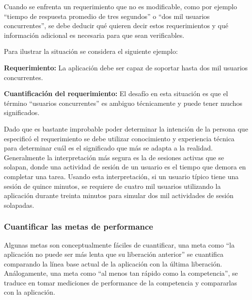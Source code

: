Cuando se enfrenta un requerimiento que no es modificable, como por ejemplo ``tiempo de respuesta promedio de tres segundos'' o ``dos mil usuarios concurrentes'', se debe deducir
qué quieren decir estos requerimientos y qué información adicional es necesaria para que sean verificables.

Para ilustrar la situación se considera el siguiente ejemplo:

\textbf{Requerimiento:} La aplicación debe ser capaz de soportar hasta dos mil usuarios concurrentes.
 
\textbf{Cuantificación del requerimiento:} El desafío en esta situación es que el término ``usuarios concurrentes'' es ambiguo técnicamente y puede tener muchos significados.

Dado que es bastante improbable poder determinar la intención de la persona que especificó el requerimiento se debe utilizar conocimiento y experiencia técnica para
determinar cuál es el significado que más se adapta a la realidad. Generalmente la interpretación más segura es la de sesiones activas que se solapan, donde una actividad de sesión de un
usuario es el tiempo que demora en completar una tarea. Usando esta interpretación, si un usuario típico
tiene una sesión de quince minutos, se requiere de cuatro mil usuarios utilizando la aplicación durante
treinta minutos para simular dos mil actividades de sesión solapadas.

\subsubsection{Cuantificar las metas de performance}  
  Algunas metas son conceptualmente fáciles de cuantificar, una meta como ``la aplicación no puede ser más lenta que su liberación anterior'' se cuantifica comparando la línea base
actual de la aplicación con la última liberación. Análogamente, una meta como ``al menos tan rápido como la competencia'', se traduce en tomar mediciones de performance de la
competencia y compararlas con la aplicación.

